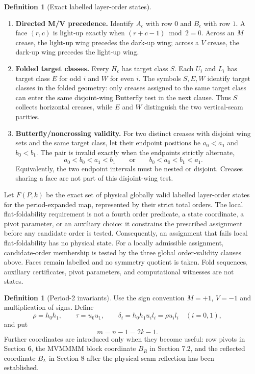 \documentclass[11pt]{article}
\theoremstyle{definition}
\newtheorem{definition}[theorem]{Definition}
\theoremstyle{remark}
\providecommand{\tightlist}{\setlength{\itemsep}{0pt}\setlength{\parskip}{0pt}}
\begin{document}
\begin{definition}[Exact labelled layer-order states]
\begin{enumerate}
\def\labelenumi{\arabic{enumi}.}
\tightlist
\item
  \textbf{Directed M/V precedence.} Identify \(A_c\) with row \(0\) and
  \(B_c\) with row \(1\). A face \((r,c)\) is light-up exactly when
  \((r+c-1)\bmod2=0\). Across an \(M\) crease, the light-up wing
  precedes the dark-up wing; across a \(V\) crease, the dark-up wing
  precedes the light-up wing.
\item
  \textbf{Folded target classes.} Every \(H_c\) has target class \(S\).
  Each \(U_i\) and \(L_i\) has target class \(E\) for odd \(i\) and
  \(W\) for even \(i\).
  The symbols \(S,E,W\) identify target classes in the folded geometry: only creases assigned to the same target class can enter the same disjoint-wing Butterfly test in the next clause. Thus \(S\) collects horizontal creases, while \(E\) and \(W\) distinguish the two vertical-seam parities.
\item
  \textbf{Butterfly/noncrossing validity.} For two distinct creases with
  disjoint wing sets and the same target class, let their endpoint
  positions be \(a_0<a_1\) and \(b_0<b_1\). The pair is invalid exactly
  when the endpoints strictly alternate, \[
  a_0<b_0<a_1<b_1
  \qquad\text{or}\qquad
  b_0<a_0<b_1<a_1.
  \] Equivalently, the two endpoint intervals must be nested or
  disjoint. Creases sharing a face are not part of this disjoint-wing
  test.
\end{enumerate}

Let \(F(P,k)\) be the exact set of physical globally valid labelled layer-order states for the period-expanded map, represented by their strict total orders. The local flat-foldability requirement is not a fourth order predicate, a state coordinate, a pivot parameter, or an auxiliary choice: it constrains the prescribed assignment before any candidate order is tested. Consequently, an assignment that fails local flat-foldability has no physical state. For a locally admissible assignment, candidate-order membership is tested by the three global order-validity clauses above. Faces remain labelled and no symmetry quotient is taken. Fold sequences, auxiliary certificates, pivot parameters, and computational witnesses are not states.
\end{definition}
\begin{definition}[Period-2 invariants]\label{obj:D2}
Use the sign convention \(M=+1\), \(V=-1\) and multiplication of signs.
Define \[
\rho=h_0h_1,\qquad
\tau=u_0u_1,\qquad
\delta_i=h_0h_1u_i l_i=\rho u_i l_i\quad(i=0,1),
\] and put \[
m=n-1=2k-1.
\] Further coordinates are introduced only when they become useful: row
pivots in Section 6, the MVMMMM block coordinate \(B_R\) in Section 7.2,
and the reflected coordinate \(B_L\) in Section 8 after the physical
seam reflection has been established.
\end{definition}
\end{document}
